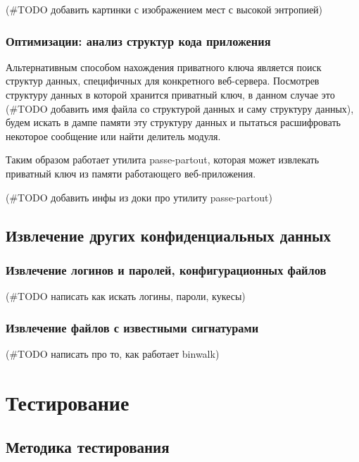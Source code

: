 \documentclass[20pt]{article}
\begin{document}
(#TODO добавить картинки с изображением мест с высокой энтропией)

\subsubsection{Оптимизации: анализ структур кода приложения}
Альтернативным способом нахождения приватного ключа является поиск структур
данных, специфичных для конкретного веб-сервера. Посмотрев структуру данных в которой
хранится приватный ключ, в данном случае это (#TODO добавить имя файла со структурой
данных и саму структуру данных), будем искать в дампе памяти эту структуру данных
и пытаться расшифровать некоторое сообщение или найти делитель модуля.

Таким образом работает утилита passe-partout, которая может извлекать приватный ключ из
памяти работающего веб-приложения.

(#TODO добавить инфы из доки про утилиту passe-partout)

\subsection{Извлечение других конфиденциальных данных}

\subsubsection{Извлечение логинов и паролей, конфигурационных файлов}
(#TODO написать как искать логины, пароли, кукесы)

\subsubsection{Извлечение файлов с известными сигнатурами}
(#TODO написать про то, как работает binwalk)

\newpage

\section{Тестирование}

\subsection{Методика тестирования}
\end{document}
